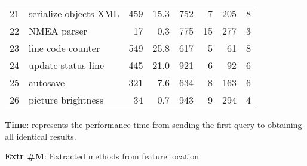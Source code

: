 \begin{table*}[ht]
\begin{center}
{\begin{tabular*}{1\textwidth}{@{}cl|rrr|rr|r@{}}
21&serialize objects XML  & 459&15.3&752 & 7 &205 & 8 \\
22&NMEA parser  & 17&0.3&775 & 15 &277 & 3 \\
23&line code counter  & 549&25.8&617 & 5 &61 & 8 \\
24&update status line  & 445&21.0&921 & 6 &92 & 6 \\
25&autosave  & 321&7.6&634 & 8 &163 & 6 \\
26&picture brightness  & 34&0.7&943 & 9 &294 & 4 \\ \hline
\end{tabular*}
 \label{tab:dataset}
{\bf Time}: represents the performance time from sending the first query to obtaining all identical results.

{\bf Extr \#M}: Extracted methods from feature location
}
 \end{center}
\end{table*}




